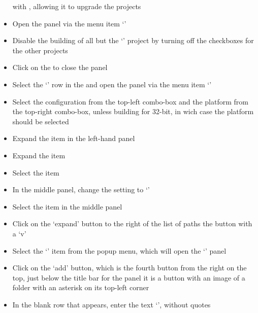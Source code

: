 \begin{itemize}
 with , allowing it to upgrade the
projects
\item\exSp{}Open the  panel via the menu item
`'
\item\exSp{}Disable the building of all but the `' project by turning
off the  checkboxes for the other projects
\item\exSp{}Click on the  to close the  panel
\item\exSp{}Select the `' row in the  and
open the  panel via the menu item
`'
\item\exSp{}Select the  configuration from the top-left
combo-box and the  platform from the top-right combo-box, unless building for
32-bit, in wich case the  platform should be selected
\item\exSp{}Expand the  item in the left-hand panel
\item\exSp{}Expand the  item
\item\exSp{}Select the  item
\item\exSp{}In the middle panel, change the  setting to
`'
\item\exSp{}Select the  item in the middle panel
\item\exSp{}Click on the `expand' button to the right of the list of paths \longDash{} the
button with a `v'
\item\exSp{}Select the `' item from the popup menu, which
will open the `' panel
\item\exSp{}Click on the `add' button, which is the fourth button from the right on the
top, just below the title bar for the panel \longDash{} it is a button with an image of a
folder with an asterisk on its top-left corner
\item\exSp{}In the blank row that appears, enter the text
`',
without quotes

\end{itemize}
